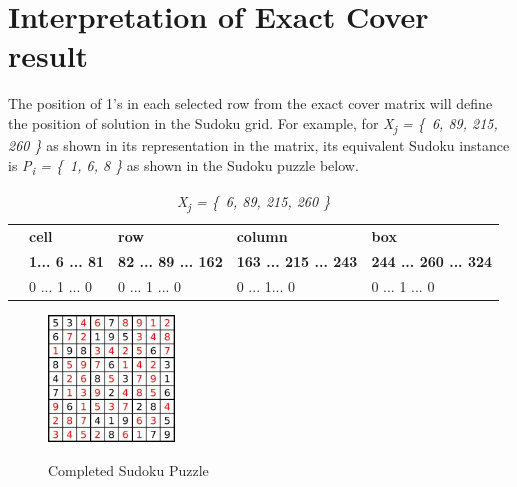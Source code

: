 \documentclass[a4paper,oneside,11pt]{report}
\begin{document}
\newpage
\section{Interpretation of Exact Cover result}
The position of 1’s in each selected row from the exact cover matrix will define the position of solution in the Sudoku grid. For example, for {\itshape X\textsubscript{j} = \{\ 6, 89, 215, 260 \}} as shown in its representation in the matrix, its equivalent Sudoku instance is {\itshape P\textsubscript{i} = \{\ 1, 6, 8 \}} as shown in the Sudoku puzzle below.

\begin{table}[!ht]
\begin{tabular}{m{1cm} m{3cm} m{3cm} m{3cm} m{3cm}}
& \textbf{cell} & \textbf{row} & \textbf{column} & \textbf{box}\\ 
& \textbf{1\hspace{0.1cm}...\hspace{0.1cm} 6 \hspace{0.1cm}... \hspace{0.1cm}	81} & \textbf{82\hspace{0.1cm} ... 89 \hspace{0.1cm}... 162} & \textbf{163 ... 215 ... 243} & \textbf{244 ... 260 ... 324}\\ 
& 0 ...\hspace{0.1cm} 1 \hspace{0.1cm}... \hspace{0.1cm}	0 & 0 \hspace{0.2cm} ...\hspace{0.1cm} 1 \hspace{0.2cm}... \hspace{0.1cm}	0 & 0\hspace{0.4cm} ...\hspace{0.2cm} 1\hspace{0.28cm}... \hspace{0.1cm}0 & 0\hspace{0.4cm} ...\hspace{0.2cm} 1 \hspace{0.18cm}... \hspace{0.1cm}	0\\ 
\end{tabular}
\caption{{\itshape X\textsubscript{j} = \{\ 6, 89, 215, 260 \}}}
\end{table}

\begin{figure}[h]
  \centering
  {\includegraphics[width=0.3\textwidth]{Sudoku_Puzzle_Answer.jpg}\label{fig:puzzleanswer}}
  \caption{Completed Sudoku Puzzle}
\end{figure}
\end{document}
